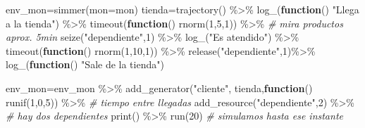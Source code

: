 \documentclass[
]{book}
\newenvironment{Shaded}{\begin{snugshade}}{\end{snugshade}}
\newcommand{\AttributeTok}[1]{\textcolor[rgb]{0.77,0.63,0.00}{#1}}
\newcommand{\CommentTok}[1]{\textcolor[rgb]{0.56,0.35,0.01}{\textit{#1}}}
\newcommand{\ControlFlowTok}[1]{\textcolor[rgb]{0.13,0.29,0.53}{\textbf{#1}}}
\newcommand{\DecValTok}[1]{\textcolor[rgb]{0.00,0.00,0.81}{#1}}
\newcommand{\FunctionTok}[1]{\textcolor[rgb]{0.00,0.00,0.00}{#1}}
\newcommand{\NormalTok}[1]{#1}
\newcommand{\OtherTok}[1]{\textcolor[rgb]{0.56,0.35,0.01}{#1}}
\newcommand{\SpecialCharTok}[1]{\textcolor[rgb]{0.00,0.00,0.00}{#1}}
\newcommand{\StringTok}[1]{\textcolor[rgb]{0.31,0.60,0.02}{#1}}
\theoremstyle{definition}
\theoremstyle{definition}
\theoremstyle{definition}
\theoremstyle{definition}
\theoremstyle{remark}
\begin{document}
\begin{Shaded}
\begin{Highlighting}[]
\NormalTok{env\_mon}\OtherTok{=}\FunctionTok{simmer}\NormalTok{(}\AttributeTok{mon=}\NormalTok{mon)}
\NormalTok{tienda}\OtherTok{=}\FunctionTok{trajectory}\NormalTok{() }\SpecialCharTok{\%\textgreater{}\%}
  \FunctionTok{log\_}\NormalTok{(}\ControlFlowTok{function}\NormalTok{()  }\StringTok{"Llega a la tienda"}\NormalTok{) }\SpecialCharTok{\%\textgreater{}\%}
  \FunctionTok{timeout}\NormalTok{(}\ControlFlowTok{function}\NormalTok{() }\FunctionTok{rnorm}\NormalTok{(}\DecValTok{1}\NormalTok{,}\DecValTok{5}\NormalTok{,}\DecValTok{1}\NormalTok{)) }\SpecialCharTok{\%\textgreater{}\%} \CommentTok{\# mira productos aprox. 5min}
  \FunctionTok{seize}\NormalTok{(}\StringTok{"dependiente"}\NormalTok{,}\DecValTok{1}\NormalTok{) }\SpecialCharTok{\%\textgreater{}\%}
  \FunctionTok{log\_}\NormalTok{(}\StringTok{"Es atendido"}\NormalTok{) }\SpecialCharTok{\%\textgreater{}\%}
  \FunctionTok{timeout}\NormalTok{(}\ControlFlowTok{function}\NormalTok{() }\FunctionTok{rnorm}\NormalTok{(}\DecValTok{1}\NormalTok{,}\DecValTok{10}\NormalTok{,}\DecValTok{1}\NormalTok{)) }\SpecialCharTok{\%\textgreater{}\%}
  \FunctionTok{release}\NormalTok{(}\StringTok{"dependiente"}\NormalTok{,}\DecValTok{1}\NormalTok{)}\SpecialCharTok{\%\textgreater{}\%}
  \FunctionTok{log\_}\NormalTok{(}\ControlFlowTok{function}\NormalTok{() }\StringTok{"Sale de la tienda"}\NormalTok{)}

\NormalTok{env\_mon}\OtherTok{=}\NormalTok{env\_mon }\SpecialCharTok{\%\textgreater{}\%}
  \FunctionTok{add\_generator}\NormalTok{(}\StringTok{"cliente"}\NormalTok{, tienda,}\ControlFlowTok{function}\NormalTok{() }\FunctionTok{runif}\NormalTok{(}\DecValTok{1}\NormalTok{,}\DecValTok{0}\NormalTok{,}\DecValTok{5}\NormalTok{)) }\SpecialCharTok{\%\textgreater{}\%} \CommentTok{\# tiempo entre llegadas }
  \FunctionTok{add\_resource}\NormalTok{(}\StringTok{"dependiente"}\NormalTok{,}\DecValTok{2}\NormalTok{) }\SpecialCharTok{\%\textgreater{}\%} \CommentTok{\# hay dos dependientes}
  \FunctionTok{print}\NormalTok{() }\SpecialCharTok{\%\textgreater{}\%}
  \FunctionTok{run}\NormalTok{(}\DecValTok{20}\NormalTok{) }\CommentTok{\# simulamos hasta ese instante}
\end{Highlighting}
\end{Shaded}
\end{document}
